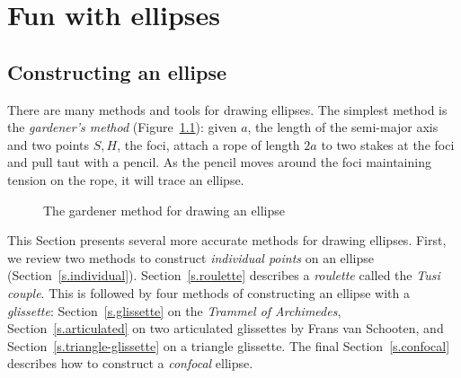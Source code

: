 
\part{Fun with ellipses}


\chapter{Constructing an ellipse}\label{s.constructing}

There are many methods and tools for drawing ellipses. The simplest method is the \emph{gardener's method} (Figure~\ref{f.gardener}): given $a$, the length of the semi-major axis and two points $S,H$, the foci, attach a rope of length $2a$ to two stakes at the foci and pull taut with a pencil. As the pencil moves around the foci maintaining tension on the rope, it will trace an ellipse.


\begin{figure}[b]
\begin{center}
\caption{The gardener method for drawing an ellipse}\label{f.gardener}
\end{center}
\end{figure}


This Section presents several more accurate methods for drawing ellipses. First, we review two methods to construct \emph{individual points} on an ellipse (Section~\ref{s.individual}).  Section~\ref{s.roulette} describes a \emph{roulette} called the \emph{Tusi couple}. This is followed by four methods of constructing an ellipse with a \emph{glissette}: Section~\ref{s.glissette} on the \emph{Trammel of Archimedes}, Section~\ref{s.articulated} on two articulated glissettes by Frans van Schooten, and Section~\ref{s.triangle-glissette} on a triangle glissette. The final Section~\ref{s.confocal} describes how to construct a \emph{confocal} ellipse.

